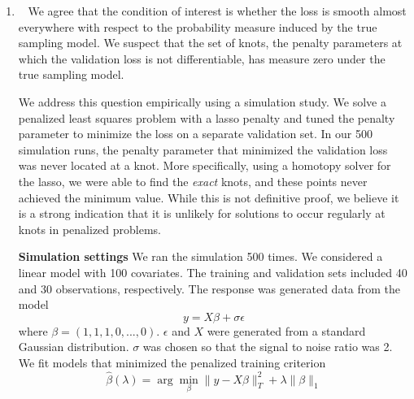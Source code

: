 \documentclass[]{article}
\newcommand{\reply}{\item[]\ }
\begin{document}
\begin{enumerate}
		\reply 	
		We agree that the condition of interest is whether the loss is smooth almost everywhere with respect to the probability measure induced by the true sampling model. We suspect that the set of knots, the penalty parameters at which the validation loss is not differentiable, has measure zero under the true sampling model. 
		
		We address this question empirically using a simulation study. We solve a penalized least squares problem with a lasso penalty and tuned the penalty parameter to minimize the loss on a separate validation set. In our 500 simulation runs, the penalty parameter that minimized the validation loss was never located at a knot. More specifically, using a homotopy solver for the lasso, we were able to find the \emph{exact} knots, and these points never achieved the minimum value. While this is not definitive proof, we believe it is a strong indication that it is unlikely for solutions to occur regularly at knots in penalized problems.
		
		\textbf{Simulation settings} We ran the simulation 500 times. We considered a linear model with 100 covariates. The training and validation sets included 40 and 30 observations, respectively. The response was generated data from the model
		$$
		y = X\beta + \sigma\epsilon
		$$
		where $\beta = (1, 1, 1, 0, ..., 0)$. $\epsilon$ and $X$ were generated from a standard Gaussian distribution. $\sigma$ was chosen so that the signal to noise ratio was 2. We fit models that minimized the penalized training criterion
		$$
		\hat{\beta}(\lambda) = \arg\min_{\beta} \| y - X\beta \|_T^2 + \lambda \|\beta\|_1
		$$
		
	\end{enumerate}
\end{document}

